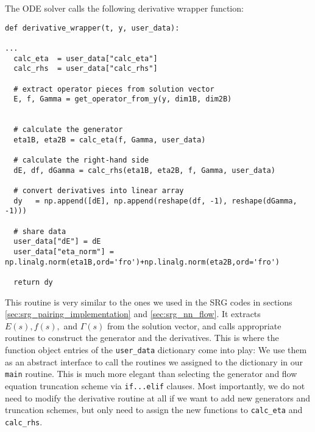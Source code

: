 The ODE solver calls the following derivative wrapper function:
\begin{lstlisting}
def derivative_wrapper(t, y, user_data):

...
  calc_eta  = user_data["calc_eta"]
  calc_rhs  = user_data["calc_rhs"]

  # extract operator pieces from solution vector
  E, f, Gamma = get_operator_from_y(y, dim1B, dim2B)


  # calculate the generator
  eta1B, eta2B = calc_eta(f, Gamma, user_data)

  # calculate the right-hand side
  dE, df, dGamma = calc_rhs(eta1B, eta2B, f, Gamma, user_data)

  # convert derivatives into linear array
  dy   = np.append([dE], np.append(reshape(df, -1), reshape(dGamma, -1)))

  # share data
  user_data["dE"] = dE
  user_data["eta_norm"] = np.linalg.norm(eta1B,ord='fro')+np.linalg.norm(eta2B,ord='fro')
  
  return dy
\end{lstlisting}
This routine is very similar to the ones we used in the SRG
codes in sections \ref{sec:srg_pairing_implementation} and \ref{sec:srg_nn_flow}. It extracts
$E(s), f(s),$ and $\Gamma(s)$ from the solution vector, and calls 
appropriate routines to construct the generator and the derivatives.
This is where the function object entries of the \texttt{user\_data}
dictionary come into play: We use them as an abstract interface
to call the routines we assigned to the dictionary in our \texttt{main} 
routine. This is much more elegant than selecting the generator and
flow equation truncation scheme via \texttt{if...elif} clauses. Most 
importantly, we do not need to modify the derivative routine at all 
if we want to add new generators and truncation schemes, but only
need to assign the new functions to \texttt{calc\_eta} and 
\texttt{calc\_rhs}.

